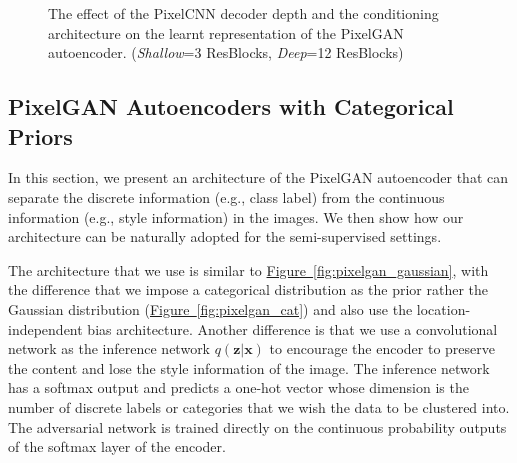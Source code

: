 \documentclass{article}
\newcommand{\myfig}[1]{\hyperref[fig:#1]{Figure~\ref*{fig:#1}}}
\begin{document}
\begin{figure}[t]
\centering
\hspace*{0.3cm}
\hspace{-.15cm}
\hspace*{0.3cm}
\hspace{-.15cm}
\hspace*{0.3cm}
\hspace{-.15cm}
\hspace*{0.3cm}
\vspace{-.3cm}
\caption{\label{fig:mnist_code} The effect of the PixelCNN decoder depth and the conditioning architecture on the learnt representation of the PixelGAN autoencoder. (\emph{Shallow}=3 ResBlocks, \emph{Deep}=12 ResBlocks)}
\end{figure}




\subsection{PixelGAN Autoencoders with Categorical Priors}\label{sec:pixelgan_cat}




In this section, we present an architecture of the PixelGAN autoencoder that can separate the discrete information (e.g., class label) from the continuous information (e.g., style information) in the images. 
We then show how our architecture can be naturally adopted for the semi-supervised settings.

The architecture that we use is similar to \myfig{pixelgan_gaussian}, with the difference that we impose a categorical distribution as the prior rather the Gaussian distribution (\myfig{pixelgan_cat}) and also use the location-independent bias architecture. Another difference is that we use a convolutional network as the inference network $q(\mathbf{z}|\mathbf{x})$ to encourage the encoder to preserve the content and lose the style information of the image. The inference network has a softmax output and predicts a one-hot vector whose dimension is the number of discrete labels or categories that we wish the data to be clustered into. The adversarial network is trained directly on the continuous probability outputs of the softmax layer of the encoder. 
\end{document}
